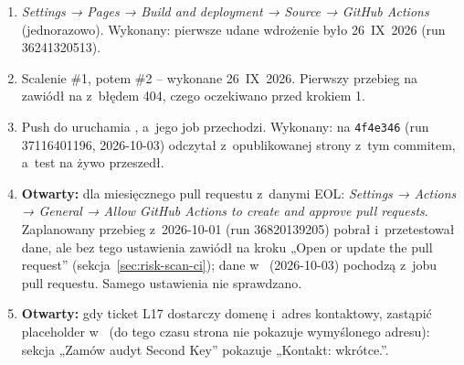 \begin{enumerate}
  \item \emph{Settings → Pages → Build and deployment → Source → GitHub Actions} (jednorazowo).
        Wykonany: pierwsze udane wdrożenie było 26~IX~2026 (run 36241320513).
  \item Scalenie \#1, potem \#2 -- wykonane 26~IX~2026. Pierwszy przebieg  na
         zawiódł na  z~błędem 404, czego oczekiwano
        przed krokiem 1.
  \item Push do  uruchamia , a~jego job 
        przechodzi. Wykonany: na \texttt{4f4e346} (run 37116401196, 2026-10-03)
         odczytał z~opublikowanej strony  z~tym commitem,
        a~test na żywo przeszedł.
  \item \textbf{Otwarty:} dla miesięcznego pull requestu z~danymi EOL: \emph{Settings → Actions
        → General → Allow GitHub Actions to create and approve pull requests}. Zaplanowany
        przebieg z~2026-10-01 (run 36820139205) pobrał i~przetestował dane, ale bez tego
        ustawienia zawiódł na kroku „Open or update the pull request”
        (sekcja~\ref{sec:risk-scan-ci}); dane w~ (2026-10-03) pochodzą
        z~jobu  pull requestu. Samego ustawienia nie sprawdzano.
  \item \textbf{Otwarty:} gdy ticket L17 dostarczy domenę i~adres kontaktowy, zastąpić
        placeholder  w~ (do tego czasu strona nie
        pokazuje wymyślonego adresu): sekcja „Zamów audyt Second Key” pokazuje „Kontakt:
        wkrótce.”.
\end{enumerate}

